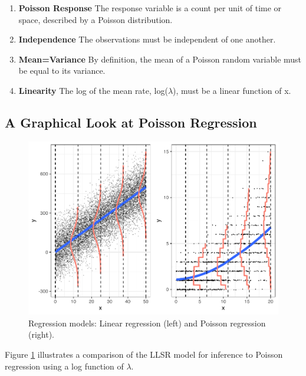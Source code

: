 \documentclass[
]{krantz}
\providecommand{\tightlist}{%
  \setlength{\itemsep}{0pt}\setlength{\parskip}{0pt}}
\begin{document}
\begin{enumerate}
\def\labelenumi{\arabic{enumi}.}
\tightlist
\item
  \textbf{Poisson Response} The response variable is a count per unit of time or space, described by a Poisson distribution.
\item
  \textbf{Independence} The observations must be independent of one another.
\item
  \textbf{Mean=Variance} By definition, the mean of a Poisson random variable must be equal to its variance.
\item
  \textbf{Linearity} The log of the mean rate, log(\(\lambda\)), must be a linear function of x.
\end{enumerate}

\hypertarget{a-graphical-look-at-poisson-regression}{%
\subsection{A Graphical Look at Poisson Regression}\label{a-graphical-look-at-poisson-regression}}

\begin{figure}

{\centering \includegraphics[width=0.6\linewidth]{bookdown-BeyondMLR_files/figure-latex/OLSpois-1} 

}

\caption{Regression models: Linear regression (left) and Poisson regression (right).}\label{fig:OLSpois}
\end{figure}

Figure \ref{fig:OLSpois} illustrates a comparison of the LLSR model for inference to Poisson regression using a log function of \(\lambda\).
\end{document}
